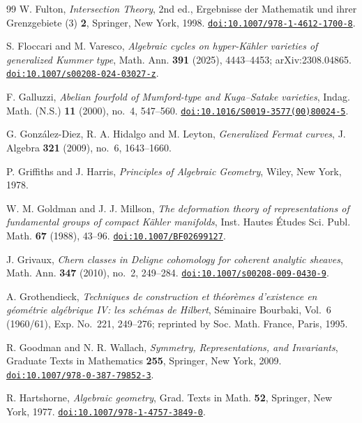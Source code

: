 \documentclass[11pt,reqno]{amsart}
\theoremstyle{plain}
\theoremstyle{definition}
\theoremstyle{remark}
\begin{document}
\begin{thebibliography}{99}
W. Fulton,
\emph{Intersection Theory}, 2nd ed.,
Ergebnisse der Mathematik und ihrer Grenzgebiete (3) \textbf{2},
Springer, New York, 1998.
\href{https://doi.org/10.1007/978-1-4612-1700-8}{\texttt{doi:10.1007/978-1-4612-1700-8}}.

S. Floccari and M. Varesco,
\emph{Algebraic cycles on hyper-K\"ahler varieties of generalized Kummer
type},
Math. Ann. \textbf{391} (2025), 4443--4453; arXiv:2308.04865.
\href{https://doi.org/10.1007/s00208-024-03027-z}{\texttt{doi:10.1007/s00208-024-03027-z}}.

F. Galluzzi,
\emph{Abelian fourfold of Mumford-type and Kuga--Satake varieties},
Indag. Math. (N.S.) \textbf{11} (2000), no.~4, 547--560.
\href{https://doi.org/10.1016/S0019-3577(00)80024-5}{\texttt{doi:10.1016/S0019-3577(00)80024-5}}.

G. Gonz\'alez-Diez, R. A. Hidalgo and M. Leyton,
\emph{Generalized Fermat curves},
J. Algebra \textbf{321} (2009), no.~6, 1643--1660.

P. Griffiths and J. Harris,
\emph{Principles of Algebraic Geometry},
Wiley, New York, 1978.

W. M. Goldman and J. J. Millson,
\emph{The deformation theory of representations of fundamental groups of
compact K\"ahler manifolds},
Inst. Hautes \'Etudes Sci. Publ. Math. \textbf{67} (1988), 43--96.
\href{https://doi.org/10.1007/BF02699127}{\texttt{doi:10.1007/BF02699127}}.

J. Grivaux,
\emph{Chern classes in Deligne cohomology for coherent analytic sheaves},
Math. Ann. \textbf{347} (2010), no.~2, 249--284.
\href{https://doi.org/10.1007/s00208-009-0430-9}{\texttt{doi:10.1007/s00208-009-0430-9}}.

A. Grothendieck,
\emph{Techniques de construction et th\'eor\`emes d'existence en g\'eom\'etrie
alg\'ebrique IV: les sch\'emas de Hilbert},
S\'eminaire Bourbaki, Vol.~6 (1960/61), Exp. No.~221, 249--276;
reprinted by Soc. Math. France, Paris, 1995.

R. Goodman and N. R. Wallach,
\emph{Symmetry, Representations, and Invariants},
Graduate Texts in Mathematics \textbf{255}, Springer, New York, 2009.
\href{https://doi.org/10.1007/978-0-387-79852-3}{\texttt{doi:10.1007/978-0-387-79852-3}}.

R. Hartshorne,
\emph{Algebraic geometry},
Grad. Texts in Math. \textbf{52}, Springer, New York, 1977.
\href{https://doi.org/10.1007/978-1-4757-3849-0}{\texttt{doi:10.1007/978-1-4757-3849-0}}.


\end{thebibliography}
\end{document}
